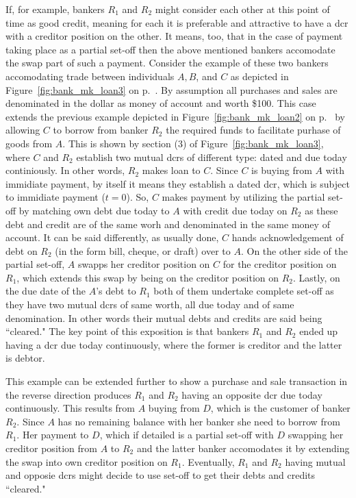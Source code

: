 If, for example, bankers \textit{$R_1$} and \textit{$R_2$} might consider each other at this point of time as good credit, meaning for each it is preferable and attractive to have a \acf{dcr} with a creditor position on the other. It means, too, that in the case of payment taking place as a partial set-off then the above mentioned bankers accomodate the swap part of such a payment. Consider the example of these two bankers accomodating trade between individuals $A, B$, and $C$ as depicted in Figure~\ref{fig:bank_mk_loan3} on p.~\pageref{fig:bank_mk_loan3}. By assumption all purchases and sales are denominated in the dollar as money of account and worth \$100. This case extends the previous example depicted in Figure~\ref{fig:bank_mk_loan2} on p.~\pageref{fig:bank_mk_loan3} by allowing $C$ to borrow from banker $R_2$ the required funds to facilitate purhase of goods from $A$. This is shown by section (3) of Figure~\ref{fig:bank_mk_loan3}, where $C$ and $R_2$ establish two mutual \acfp{dcr} of different type: dated and due today continiously. In other words, $R_2$ makes loan to $C$. Since $C$ is buying from $A$ with immidiate payment, by itself it means they establish a dated \acf{dcr}, which is subject to immidiate payment ($t=0$). So, $C$ makes payment by utilizing the partial set-off by matching own debt due today to $A$ with credit due today on $R_2$ as these debt and credit are of the same worh and denominated in the same money of account. It can be said differently, as usually done, $C$ hands acknowledgement of debt on $R_2$ (in the form bill, cheque, or draft) over to $A$. On the other side of the partial set-off, $A$ swapps her creditor position on $C$ for the creditor position on $R_1$, which extends this swap by being on the creditor position on $R_2$. Lastly, on the due date of the $A$'s debt to $R_1$ both of them undertake complete set-off as they have two mutual \acp{dcr} of same worth, all due today and of same denomination. In other words their mutual debts and credits are said being ``cleared." The key point of this exposition is that bankers $R_1$ and $R_2$ ended up having a \acf{dcr} due today continuously, where the former is creditor and the latter is debtor.

This example can be extended further to show a purchase and sale transaction in the reverse direction produces $R_1$ and $R_2$ having an  opposite \acf{dcr} due today continuously. This results from $A$ buying from $D$, which is the customer of banker $R_2$. Since $A$ has no remaining balance with her banker she need to borrow from $R_1$. Her payment to $D$, which if detailed is a partial set-off with $D$ swapping her creditor position from $A$ to $R_2$ and the latter banker accomodates it by extending the swap into own creditor position on $R_1$. Eventually, $R_1$ and $R_2$ having mutual and opposie \acp{dcr} might decide to use set-off to get their debts and credits ``cleared."

